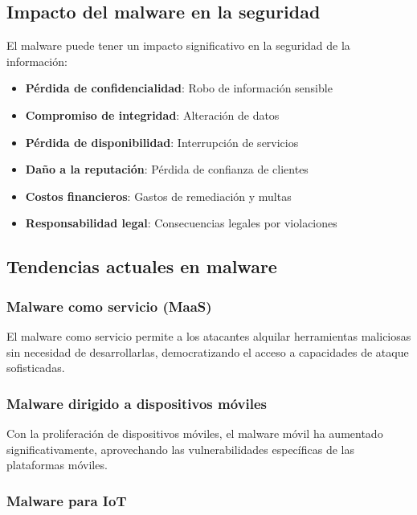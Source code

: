 \subsection{Impacto del malware en la seguridad}

El malware puede tener un impacto significativo en la seguridad de la información:

\begin{itemize}
    \item \textbf{Pérdida de confidencialidad}: Robo de información sensible
    \item \textbf{Compromiso de integridad}: Alteración de datos
    \item \textbf{Pérdida de disponibilidad}: Interrupción de servicios
    \item \textbf{Daño a la reputación}: Pérdida de confianza de clientes
    \item \textbf{Costos financieros}: Gastos de remediación y multas
    \item \textbf{Responsabilidad legal}: Consecuencias legales por violaciones
\end{itemize}

\subsection{Tendencias actuales en malware}

\subsubsection{Malware como servicio (MaaS)}

El malware como servicio permite a los atacantes alquilar herramientas maliciosas sin necesidad de desarrollarlas, democratizando el acceso a capacidades de ataque sofisticadas.

\subsubsection{Malware dirigido a dispositivos móviles}

Con la proliferación de dispositivos móviles, el malware móvil ha aumentado significativamente, aprovechando las vulnerabilidades específicas de las plataformas móviles.

\subsubsection{Malware para IoT}


